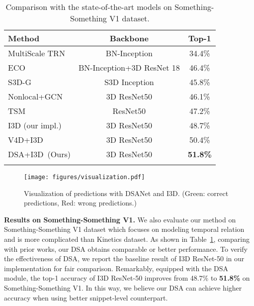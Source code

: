 \documentclass[sigconf]{acmart}
\begin{document}
\begin{table}[h]
\caption{Comparison with the state-of-the-art models on Something-Something V1 dataset.}
\begin{center}
\begin{tabular}{lcc}
\shline
{ Method} & { Backbone} &  {Top-1} \\
\hline
MultiScale TRN~\cite{trn} & BN-Inception & 34.4\% \\
ECO~\cite{eco} & BN-Inception+3D ResNet 18 & 46.4\% \\
S3D-G~\cite{s3d} & {S3D Inception} & 45.8\% \\
Nonlocal+GCN~\cite{gcn} &{3D ResNet50} & 46.1\%  \\
TSM~\cite{tsm} & {ResNet50} & 47.2\% \\
I3D (our impl.) & {3D ResNet50} & 48.7\% \\
V4D+I3D ~\cite{zhang2020v4d} &{3D ResNet50}  & 50.4\%  \\
\hline
DSA+I3D~(Ours) &{3D ResNet50}  & \textbf{51.8\%}  \\
\shline
\end{tabular}
\end{center}
\label{cmp_sthv1}
\end{table} 

\begin{figure*}[t]
    \centering
    \texttt{[image: figures/visualization.pdf]}
    \caption{Visualization of predictions with DSANet and I3D.  (\textcolor[RGB]{0,176,80}{Green}: correct predictions,  \textcolor[RGB]{246,0,0}{Red}: wrong predictions.)}
    \label{fig:vis}
\end{figure*} 


\textbf{Results on Something-Something V1.}
We also evaluate our method on Something-Something V1 dataset which focuses on modeling temporal relation and is more complicated than Kinetics dataset.
As shown in Table~\ref{cmp_sthv1}, comparing with prior works, our DSA obtains comparable or better performance.
To verify the effectiveness of DSA, we report the baseline result of I3D ResNet-50 in our implementation for fair comparison. 
Remarkably, equipped with the DSA module, the top-1 accuracy of I3D ResNet-50 improves from 48.7\% to \textbf{51.8\%} on Something-Something V1.
In this way, we believe our DSA can achieve higher accuracy when using better snippet-level counterpart.
\end{document}
